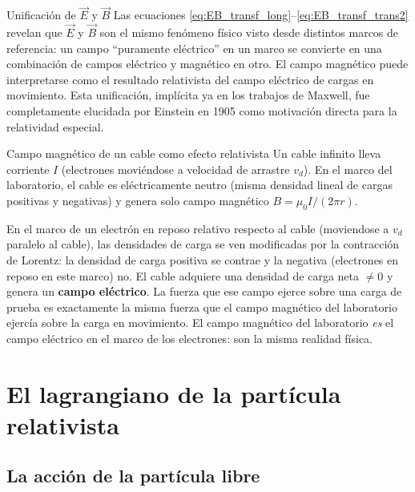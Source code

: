\begin{observacion}{Unificación de $\vec{E}$ y $\vec{B}$}{}
Las ecuaciones \eqref{eq:EB_transf_long}--\eqref{eq:EB_transf_trans2} revelan que $\vec{E}$ y $\vec{B}$ son el mismo fenómeno físico visto desde distintos marcos de referencia: un campo ``puramente eléctrico'' en un marco se convierte en una combinación de campos eléctrico y magnético en otro. El campo magnético puede interpretarse como el resultado relativista del campo eléctrico de cargas en movimiento. Esta unificación, implícita ya en los trabajos de Maxwell, fue completamente elucidada por Einstein en 1905 como motivación directa para la relatividad especial.
\end{observacion}

\begin{ejemplo}{Campo magnético de un cable como efecto relativista}{}
Un cable infinito lleva corriente $I$ (electrones moviéndose a velocidad de arrastre $v_d$). En el marco del laboratorio, el cable es eléctricamente neutro (misma densidad lineal de cargas positivas y negativas) y genera solo campo magnético $B = \mu_0 I/(2\pi r)$.

En el marco de un electrón en reposo relativo respecto al cable (moviendose a $v_d$ paralelo al cable), las densidades de carga se ven modificadas por la contracción de Lorentz: la densidad de carga positiva se contrae y la negativa (electrones en reposo en este marco) no. El cable adquiere una densidad de carga neta $\neq 0$ y genera un \textbf{campo eléctrico}. La fuerza que ese campo ejerce sobre una carga de prueba es exactamente la misma fuerza que el campo magnético del laboratorio ejercía sobre la carga en movimiento. El campo magnético del laboratorio \emph{es} el campo eléctrico en el marco de los electrones: son la misma realidad física.
\end{ejemplo}

\section{El lagrangiano de la partícula relativista}

\subsection{La acción de la partícula libre}

